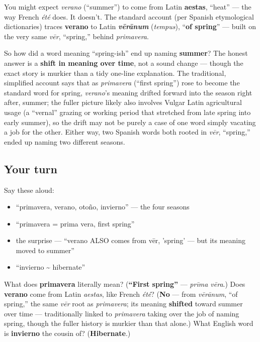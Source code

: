 \begin{culture}
You might expect \emph{verano} (\textquotedblleft{}summer\textquotedblright{}) to come from Latin \textbf{aestas}, \textquotedblleft{}heat\textquotedblright{} — the way French \emph{été} does. It doesn't. The standard account (per Spanish etymological dictionaries) traces \textbf{verano} to Latin \emph{\textbf{vērānum}} (\emph{tempus}), \textquotedblleft{}\textbf{of spring}\textquotedblright{} — built on the very same \emph{vēr}, \textquotedblleft{}spring,\textquotedblright{} behind \emph{primavera}.

So how did a word meaning \textquotedblleft{}spring-ish\textquotedblright{} end up naming \textbf{summer}? The honest answer is a \textbf{shift in meaning over time}, not a sound change — though the exact story is murkier than a tidy one-line explanation. The traditional, simplified account says that as \emph{primavera} (\textquotedblleft{}first spring\textquotedblright{}) rose to become the standard word for spring, \emph{verano}'s meaning drifted forward into the season right after, summer; the fuller picture likely also involves Vulgar Latin agricultural usage (a \textquotedblleft{}vernal\textquotedblright{} grazing or working period that stretched from late spring into early summer), so the drift may not be purely a case of one word simply vacating a job for the other. Either way, two Spanish words both rooted in \emph{vēr}, \textquotedblleft{}spring,\textquotedblright{} ended up naming two different seasons.
\end{culture}

\subsection*{Your turn}
Say these aloud:

\begin{itemize}
\raggedright
  \item \textquotedblleft{}primavera, verano, otoño, invierno\textquotedblright{} — the four seasons
  \item \textquotedblleft{}primavera = prima vera, first spring\textquotedblright{}
  \item the surprise — \textquotedblleft{}verano ALSO comes from vēr, 'spring' — but its meaning moved to summer\textquotedblright{}
  \item \textquotedblleft{}invierno \textasciitilde{} hibernate\textquotedblright{}
\end{itemize}

\begin{tcolorbox}[breakable,colback=teal!4,colframe=teal!35!black,title={Before you move on}]
What does \textbf{primavera} literally mean? (\textbf{\textquotedblleft{}First spring\textquotedblright{}} — \emph{prīma vēra}.) Does \textbf{verano} come from Latin \emph{aestas}, like French \emph{été}? (\textbf{No} — from \emph{vērānum}, \textquotedblleft{}of spring,\textquotedblright{} the same \emph{vēr} root as \emph{primavera}; its meaning \textbf{shifted} toward summer over time — traditionally linked to \emph{primavera} taking over the job of naming spring, though the fuller history is murkier than that alone.) What English word is \textbf{invierno} the cousin of? (\textbf{Hibernate}.)
\end{tcolorbox}
